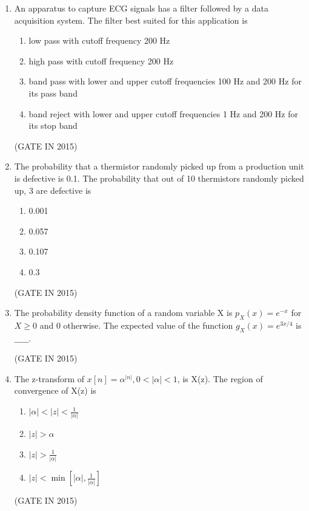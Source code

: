 \documentclass[journal]{IEEEtran}
\begin{document}
\begin{enumerate}
\item An apparatus to capture ECG signals has a filter followed by a data acquisition system. The filter best suited for this application is


\begin{enumerate}
\item low pass with cutoff frequency 200 Hz
\item high pass with cutoff frequency 200 Hz
\item band pass with lower and upper cutoff frequencies 100 Hz and 200 Hz for its pass band
\item band reject with lower and upper cutoff frequencies 1 Hz and 200 Hz for its stop band
\end{enumerate}
\hfill(GATE IN 2015)

\item The probability that a thermistor randomly picked up from a production unit is defective is 0.1. The probability that out of 10 thermistors randomly picked up, 3 are defective is

\begin{multicols}{4}
\begin{enumerate}
\item 0.001
\item 0.057
\item 0.107
\item 0.3
\end{enumerate}
  \end{multicols} \hfill(GATE IN 2015)

\item The probability density function of a random variable X is $p_X(x) = e^{-x}$ for $X\geq0$ and 0 otherwise. The expected value of the function ${g_X}(x) = e^{3x/4}$ is $\_\_\_\_\_$.

 \hfill(GATE IN 2015)

\item The z-transform of $x[n] = \alpha^{|n|}, 0 < |\alpha| < 1$, is X(z). The region of convergence of X(z) is

\begin{multicols}{4}
\begin{enumerate}
\item $|\alpha| < |z| < \frac{1}{|\alpha|}$
\item $|z| > \alpha$
\item $|z| > \frac{1}{|\alpha|}$
\item $|z| < \min[|\alpha|, \frac{1}{|\alpha|}]$
\end{enumerate}
  \end{multicols} \hfill(GATE IN 2015)


\end{enumerate}
\end{document}
